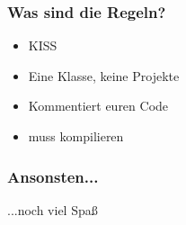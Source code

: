 \documentclass[accentcolor=tud3c,colorbacktitle,inverttitle,landscape,german,presentation,t]{tudbeamer}
\begin{document}
\begin{frame}
	\frametitle{Was sind die Regeln?}
	\begin{itemize}
		\item KISS
		\item Eine Klasse, keine Projekte
		\item Kommentiert euren Code 
		\item muss kompilieren
	\end{itemize}
\end{frame}

\begin{frame}
	\frametitle{Ansonsten...}
	\vspace{15mm}
	\begin{center}
		\huge ...noch viel Spaß
	\end{center}
\end{frame}
\end{document}
